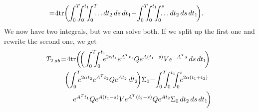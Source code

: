 \documentclass[twocolumn]{autart}
\begin{document}
\begin{pf}
\begin{align}
& \hspace{-2pt}=\hspace{-2pt} 4\tr\bigg(\hspace{-2pt} \int_0^T \hspace{-6pt} \int_0^{t_1} \hspace{-6pt} \int_0^T \hspace{-7pt} \ldots dt_2 \, ds \, dt_1 \hspace{-2pt}-\hspace{-2pt} \int_0^T \hspace{-6pt} \int_0^{t_1} \hspace{-6pt} \int_0^s \hspace{-7pt} \ldots dt_2 \, ds \, dt_1 \hspace{-2pt} \bigg). \nonumber
\end{align}
We now have two integrals, but we can solve both. If we split up the first one and rewrite the second one, we get
\begin{align}
\hspace{-2pt}T_{2,ab} & \hspace{-2pt}=\hspace{-2pt} 4\tr\bigg(\hspace{-2pt}\bigg(\hspace{-1pt}\int_0^T \hspace{-6pt} \int_0^{t_1} \hspace{-6pt} e^{2\alpha t_1} e^{A^T t_1} Q e^{A (t_1 - s)} V e^{-A^T s} \, ds \, dt_1\hspace{-2pt}\bigg) \nonumber \\
& \hspace{6pt} \bigg(\hspace{-2pt}\int_0^T \hspace{-6pt} e^{2\alpha t_2} e^{A^T t_2} Q e^{A t_2} \, dt_2\hspace{-2pt}\bigg) \Sigma_0 \hspace{-2pt}-\hspace{-2pt} \int_0^T \hspace{-6pt} \int_0^{t_1} \hspace{-6pt} \int_0^s \hspace{-6pt} e^{2\alpha(t_1+t_2)} \nonumber \\
& \hspace{18pt} e^{A^T t_1} Q e^{A (t_1 - s)} V e^{A^T (t_2 - s)} Q e^{A t_2} \Sigma_0 \, dt_2 \, ds \, dt_1\hspace{-2pt}\bigg) \nonumber \\

\end{align}
\end{pf}
\end{document}
